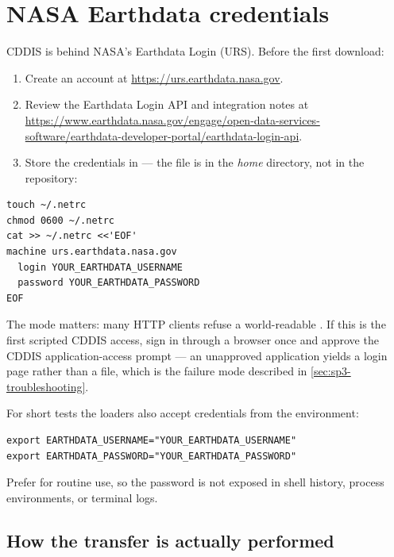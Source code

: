\section{NASA Earthdata credentials}
\label{sec:sp3-earthdata}

CDDIS is behind NASA's Earthdata Login (URS). Before the first download:

\begin{enumerate}[leftmargin=1.6em]
  \item Create an account at \url{https://urs.earthdata.nasa.gov}.
  \item Review the Earthdata Login API and integration notes at
    \url{https://www.earthdata.nasa.gov/engage/open-data-services-software/earthdata-developer-portal/earthdata-login-api}.
  \item Store the credentials in  --- the file is
     in the \emph{home} directory, not  in the
    repository:
\end{enumerate}

\begin{lstlisting}[language=shell, caption={Credential setup.}, label={lst:sp3-netrc}]
touch ~/.netrc
chmod 0600 ~/.netrc
cat >> ~/.netrc <<'EOF'
machine urs.earthdata.nasa.gov
  login YOUR_EARTHDATA_USERNAME
  password YOUR_EARTHDATA_PASSWORD
EOF
\end{lstlisting}

The  mode matters: many HTTP clients refuse a world-readable
. If this is the first scripted CDDIS access, sign in through a
browser once and approve the CDDIS application-access prompt --- an
unapproved application yields a login page rather than a file, which is the
failure mode described in \cref{sec:sp3-troubleshooting}.

For short tests the loaders also accept credentials from the environment:

\begin{lstlisting}[language=shell]
export EARTHDATA_USERNAME="YOUR_EARTHDATA_USERNAME"
export EARTHDATA_PASSWORD="YOUR_EARTHDATA_PASSWORD"
\end{lstlisting}

Prefer  for routine use, so the password is not exposed in
shell history, process environments, or terminal logs.

\subsection{How the transfer is actually performed}
\label{sec:sp3-curl}

